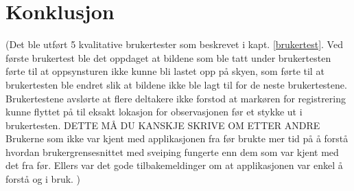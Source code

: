 \section{Konklusjon}
 (Det ble utført 5 kvalitative brukertester som beskrevet i kapt. \ref{brukertest}. Ved første brukertest ble det oppdaget at bildene som ble tatt under brukertesten førte til at oppsynsturen ikke kunne bli lastet opp på skyen, som førte til at brukertesten ble endret slik at bildene ikke ble lagt til for de neste brukertestene. Brukertestene avslørte at flere deltakere ikke forstod at markøren for registrering kunne flyttet på til eksakt lokasjon for observasjonen før et stykke ut i brukertesten. DETTE MÅ DU KANSKJE SKRIVE OM ETTER ANDRE Brukerne som ikke var kjent med applikasjonen fra før brukte mer tid på å forstå hvordan brukergrensesnittet med sveiping fungerte enn dem som var kjent med det fra før. Ellers var det gode tilbakemeldinger om at applikasjonen var enkel å forstå og i bruk. )




